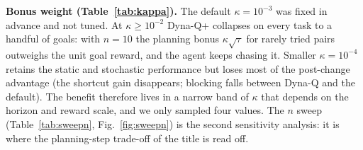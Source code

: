 \textbf{Bonus weight (Table~\ref{tab:kappa}).} The default $\kappa=10^{-3}$ was fixed in advance and not tuned. At $\kappa\ge10^{-2}$ Dyna-Q+ collapses on every task to a handful of goals: with $n=10$ the planning bonus $\kappa\sqrt{\tau}$ for rarely tried pairs outweighs the unit goal reward, and the agent keeps chasing it. Smaller $\kappa=10^{-4}$ retains the static and stochastic performance but loses most of the post-change advantage (the shortcut gain disappears; blocking falls between Dyna-Q and the default). The benefit therefore lives in a narrow band of $\kappa$ that depends on the horizon and reward scale, and we only sampled four values. The $n$ sweep (Table~\ref{tab:sweepn}, Fig.~\ref{fig:sweepn}) is the second sensitivity analysis: it is where the planning-step trade-off of the title is read off.
